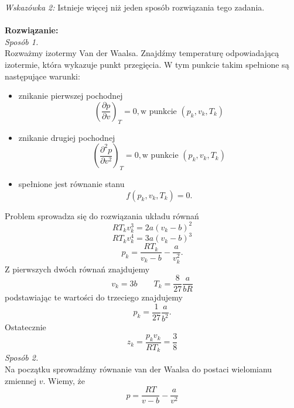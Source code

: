 \documentclass[11pt,a4paper]{article}
\newcommand{\Partial}[3]{\left( \frac{\partial #1}{\partial #2} \right)_{#3}}
\begin{document}
{\it Wskazówka 2:} Istnieje więcej niż jeden sposób rozwiązania tego zadania.\\
\\
\textbf{Rozwiązanie:}
\\
\textit{Sposób 1.}
\\
Rozważmy izotermy Van der Waalsa. Znajdźmy temperaturę odpowiadającą izotermie, która wykazuje punkt przegięcia. W tym punkcie takim spełnione są następujące warunki:
\begin{itemize}
    \item znikanie pierwszej pochodnej
    \begin{equation*}
        \Partial{p}{v}{T}=0, \text{w punkcie } (p_k,v_k,T_k)
    \end{equation*}
    \item znikanie drugiej pochodnej
    \begin{equation*}
    \left( \frac{\partial^2 p}{\partial v^2} \right)_T=0, \text{w punkcie } (p_k,v_k,T_k)
    \end{equation*}
    \item spełnione jest równanie stanu
    \begin{equation*}
        f(p_k,v_k,T_k)=0.
    \end{equation*}
\end{itemize}
Problem sprowadza się do rozwiązania układu równań
\begin{equation*}
    RT_kv_k^3=2a(v_k-b)^2
\end{equation*}
\begin{equation*}
    RT_kv_k^4=3a(v_k-b)^3
\end{equation*}
\begin{equation*}
    p_k=\frac{RT_k}{v_k-b}-\frac{a}{v_k^2}.
\end{equation*}
Z pierwszych dwóch równań znajdujemy
\begin{equation*}
    v_k=3b \qquad T_k=\frac{8}{27}\frac{a}{bR}
\end{equation*}
podstawiając te wartości do trzeciego znajdujemy
\begin{equation*}
    p_k=\frac{1}{27} \frac{a}{b^2}.
\end{equation*}
Ostatecznie 
\begin{equation*}
    z_k=\frac{p_k v_k}{R T_k}=\frac{3}{8}
\end{equation*}
\textit{Sposób 2.}
\\
Na początku sprowadźmy równanie van der Waalsa do postaci wielomianu zmiennej $v$. Wiemy, że
\begin{equation*}
    p=\frac{RT}{v-b}-\frac{a}{v^2}
\end{equation*}
\end{document}
